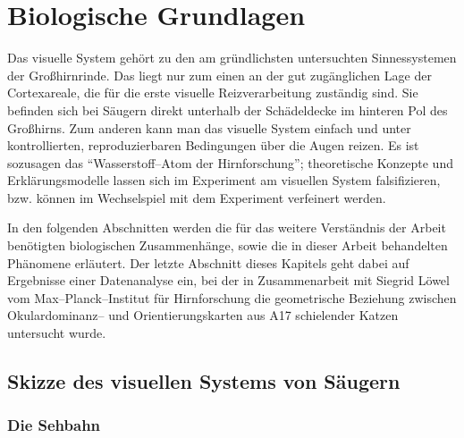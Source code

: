 \section{Biologische Grundlagen}
\label{biologie}
\thispagestyle{plain}

Das visuelle System gehört zu den am gründlichsten untersuchten
Sinnessystemen der Großhirnrinde.  Das liegt nur zum einen an der gut
zugänglichen Lage der Cortexareale, die für die erste visuelle
Reizverarbeitung zuständig sind.  Sie befinden sich bei Säugern direkt
unterhalb der Schädeldecke im hinteren Pol des Großhirns.  Zum anderen
kann man das visuelle System einfach und unter kontrollierten,
reproduzierbaren Bedingungen über die Augen reizen. Es ist sozusagen das
``Wasserstoff--Atom der Hirnforschung''; theoretische Konzepte und
Erklärungsmodelle lassen sich im Experiment am visuellen System
falsifizieren, bzw. können im Wechselspiel mit dem Experiment verfeinert
werden.

In den folgenden Abschnitten werden die für das weitere Verständnis der
Arbeit benötigten biologischen Zusammenhänge, sowie die in dieser Arbeit
behandelten Phänomene erläutert. Der letzte Abschnitt dieses Kapitels
geht dabei auf Ergebnisse einer Datenanalyse ein, bei der in Zusammenarbeit
mit Siegrid Löwel vom Max--Planck--Institut für Hirnforschung die
geometrische Beziehung zwischen Okulardominanz-- und Orientierungskarten
aus A17 schielender Katzen untersucht wurde.

\subsection{Skizze des visuellen Systems von Säugern}

\subsubsection{Die Sehbahn}
\label{sehbahnkap}

